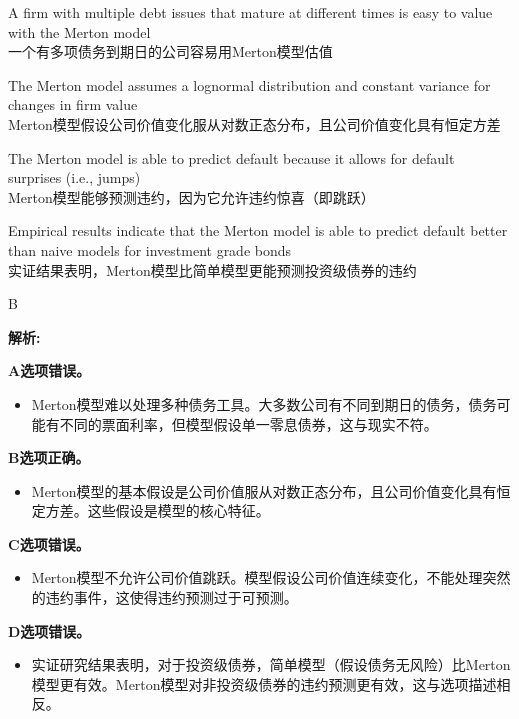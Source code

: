 \documentclass{article}
\newenvironment{explanation}
{\textbf{解析:}\par}
{\par}
\begin{document}
\begin{choices}
    \item A firm with multiple debt issues that mature at different times is easy to value with the Merton model\\
    一个有多项债务到期日的公司容易用Merton模型估值
    \item The Merton model assumes a lognormal distribution and constant variance for changes in firm value\\
    Merton模型假设公司价值变化服从对数正态分布，且公司价值变化具有恒定方差
    \item The Merton model is able to predict default because it allows for default surprises (i.e., jumps)\\
    Merton模型能够预测违约，因为它允许违约惊喜（即跳跃）
    \item Empirical results indicate that the Merton model is able to predict default better than naive models for investment grade bonds\\
    实证结果表明，Merton模型比简单模型更能预测投资级债券的违约
\end{choices}

\begin{correctanswer}
    B
\end{correctanswer}

\begin{explanation}
    \textbf{A选项错误。}
    \begin{itemize}
        \item Merton模型难以处理多种债务工具。大多数公司有不同到期日的债务，债务可能有不同的票面利率，但模型假设单一零息债券，这与现实不符。
    \end{itemize}

    \textbf{B选项正确。}
    \begin{itemize}
        \item Merton模型的基本假设是公司价值服从对数正态分布，且公司价值变化具有恒定方差。这些假设是模型的核心特征。
    \end{itemize}

    \textbf{C选项错误。}
    \begin{itemize}
        \item Merton模型不允许公司价值跳跃。模型假设公司价值连续变化，不能处理突然的违约事件，这使得违约预测过于可预测。
    \end{itemize}

    \textbf{D选项错误。}
    \begin{itemize}
        \item 实证研究结果表明，对于投资级债券，简单模型（假设债务无风险）比Merton模型更有效。Merton模型对非投资级债券的违约预测更有效，这与选项描述相反。
    \end{itemize}
\end{explanation}
\end{document}
